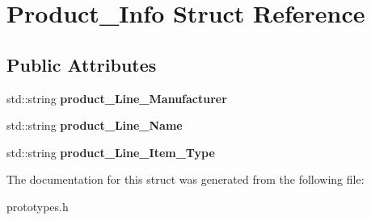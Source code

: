 \hypertarget{struct_product___info}{}\section{Product\+\_\+\+Info Struct Reference}
\label{struct_product___info}
\subsection*{Public Attributes}
\begin{DoxyCompactItemize}
\item 
\mbox{\label{struct_product___info_af1b7675646f89dbc8f73b176085f4150}} 
std\+::string {\bfseries product\+\_\+\+Line\+\_\+\+Manufacturer}
\item 
\mbox{\label{struct_product___info_aedcddaa42459b73298bd844a7ed45bdf}} 
std\+::string {\bfseries product\+\_\+\+Line\+\_\+\+Name}
\item 
\mbox{\label{struct_product___info_a4db26e369bceba352e5a3c01c1f74391}} 
std\+::string {\bfseries product\+\_\+\+Line\+\_\+\+Item\+\_\+\+Type}
\end{DoxyCompactItemize}


The documentation for this struct was generated from the following file\+:\begin{DoxyCompactItemize}
\item 
prototypes.\+h\end{DoxyCompactItemize}
